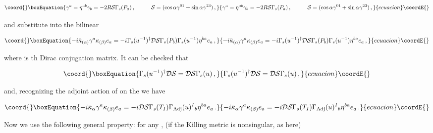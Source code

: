 \documentclass[12pt,a4paper]{article}
\begin{document}
\begin{equation}\coord{}\boxEquation{
\gamma^{a}= \eta^{ab}\gamma_{b}=-2R\mathcal{S}\Gamma_{s}(P_{a})\, ,
\hspace{1cm}
\mathcal{S}= (\cos{\alpha} \gamma^{01} +\sin{\alpha}\gamma^{23})\, ,   
}{
\gamma^{a}= \eta^{ab}\gamma_{b}=-2R\mathcal{S}\Gamma_{s}(P_{a})\, ,
\hspace{1cm}
\mathcal{S}= (\cos{\alpha} \gamma^{01} +\sin{\alpha}\gamma^{23})\, ,   
}{ecuacion}\coordE{}\end{equation}

\noindent 
and substitute into the bilinear 

\begin{equation}\coord{}\boxEquation{
-i\bar{\kappa}_{(\alpha)}\gamma^{a}\kappa_{(\beta)}e_{a} = 
-i\Gamma_{s}(u^{-1})^{\dagger}\mathcal{D}\mathcal{S}\Gamma_{s}(P_{b})
\Gamma_{s}(u^{-1})\eta^{ba}e_{a}\, ,  
}{
-i\bar{\kappa}_{(\alpha)}\gamma^{a}\kappa_{(\beta)}e_{a} = 
-i\Gamma_{s}(u^{-1})^{\dagger}\mathcal{D}\mathcal{S}\Gamma_{s}(P_{b})
\Gamma_{s}(u^{-1})\eta^{ba}e_{a}\, ,  
}{ecuacion}\coordE{}\end{equation}

\noindent
where \coordHE{} is th Dirac conjugation matrix. It can
be checked that

\begin{equation}\coord{}\boxEquation{
\Gamma_{s}(u^{-1})^{\dagger}\mathcal{D}\mathcal{S} =
\mathcal{D}\mathcal{S}\Gamma_{s}(u)\, ,
}{
\Gamma_{s}(u^{-1})^{\dagger}\mathcal{D}\mathcal{S} =
\mathcal{D}\mathcal{S}\Gamma_{s}(u)\, ,
}{ecuacion}\coordE{}\end{equation}

\noindent
and, recognizing the adjoint action of \coordHE{} on the \coordHE{}
we have

\begin{equation}\coord{}\boxEquation{
-i\bar{\kappa}_{\alpha}\gamma^{a}\kappa_{(\beta)}e_{a}
=-i\mathcal{D}\mathcal{S}\Gamma_{s}(T_{I})\Gamma_{\rm Adj}(u)^{I}{}_{b}
\eta^{ba}e_{a}\, .   
}{
-i\bar{\kappa}_{\alpha}\gamma^{a}\kappa_{(\beta)}e_{a}
=-i\mathcal{D}\mathcal{S}\Gamma_{s}(T_{I})\Gamma_{\rm Adj}(u)^{I}{}_{b}
\eta^{ba}e_{a}\, .   
}{ecuacion}\coordE{}\end{equation}

\noindent
Now we use the following general property: for any \coordHE{}, (if the
Killing metric is nonsingular, as here)
\end{document}

